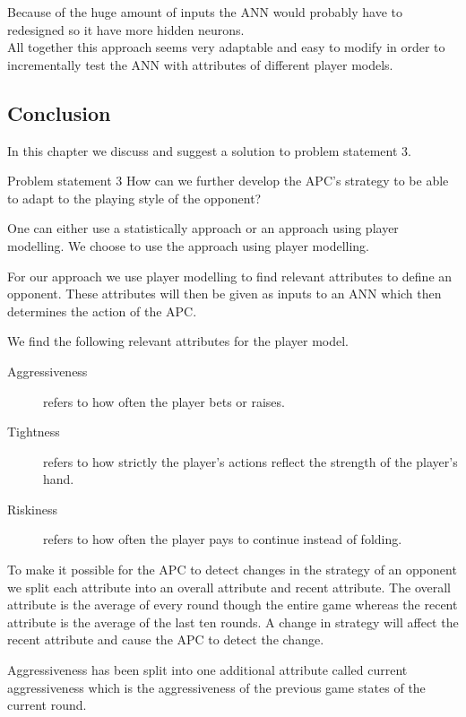 Because of the huge amount of inputs the ANN would probably have to redesigned so it have more hidden neurons.\\

All together this approach seems very adaptable and easy to modify in order to incrementally test the ANN with attributes of different player models.


\subsection{Conclusion}
In this chapter we discuss and suggest a solution to problem statement 3.

\vspace{4mm}
\begin{statementBox2}{Problem statement 3}
How can we further develop the APC's strategy to be able to adapt to the playing style of the opponent?
\end{statementBox2}
\vspace{4mm} 

One can either use a statistically approach or an approach using player modelling. We choose to use the approach using player modelling. 

For our approach we use player modelling to find relevant attributes to define an opponent. These attributes will then be given as inputs to an ANN which then determines the action of the APC. 

We find the following relevant attributes for the player model.

\begin{description}
\item[Aggressiveness] refers to how often the player bets or raises.
\item[Tightness] refers to how strictly the player's actions reflect the strength of the player's hand.
\item[Riskiness] refers to how often the player pays to continue instead of folding.
\end{description}

To make it possible for the APC to detect changes in the strategy of an opponent we split each attribute into an overall attribute and recent attribute. The overall attribute is the average of every round though the entire game whereas the recent attribute is the average of the last ten rounds. A change in strategy will affect the recent attribute and cause the APC to detect the change.

Aggressiveness has been split into one additional attribute called current aggressiveness which is the aggressiveness of the previous game states of the current round.

